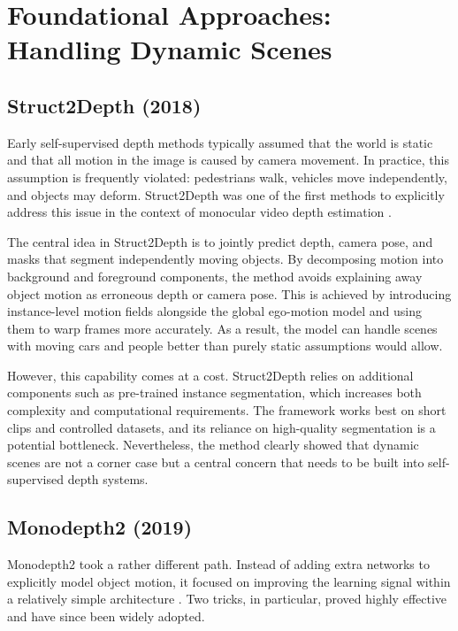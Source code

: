 \documentclass[10pt,twocolumn,letterpaper]{article}
\begin{document}
\section{Foundational Approaches: Handling Dynamic Scenes}
\label{sec:foundational}

\subsection{Struct2Depth (2018)}

Early self-supervised depth methods typically assumed that the world is static and that all motion in the image is caused by camera movement. In practice, this assumption is frequently violated: pedestrians walk, vehicles move independently, and objects may deform. Struct2Depth was one of the first methods to explicitly address this issue in the context of monocular video depth estimation \cite{casser2019depth}.

The central idea in Struct2Depth is to jointly predict depth, camera pose, and masks that segment independently moving objects. By decomposing motion into background and foreground components, the method avoids explaining away object motion as erroneous depth or camera pose. This is achieved by introducing instance-level motion fields alongside the global ego-motion model and using them to warp frames more accurately. As a result, the model can handle scenes with moving cars and people better than purely static assumptions would allow.

However, this capability comes at a cost. Struct2Depth relies on additional components such as pre-trained instance segmentation, which increases both complexity and computational requirements. The framework works best on short clips and controlled datasets, and its reliance on high-quality segmentation is a potential bottleneck. Nevertheless, the method clearly showed that dynamic scenes are not a corner case but a central concern that needs to be built into self-supervised depth systems.

\subsection{Monodepth2 (2019)}

Monodepth2 took a rather different path. Instead of adding extra networks to explicitly model object motion, it focused on improving the learning signal within a relatively simple architecture \cite{godard2019digging}. Two tricks, in particular, proved highly effective and have since been widely adopted.
\end{document}
